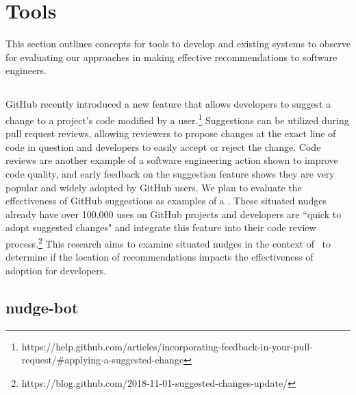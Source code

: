 \section{Tools}

This section outlines concepts for tools to develop and existing systems to observe for evaluating our approaches in making effective recommendations to software engineers.

\subsection{\TOOL}





\subsection{\SUGGS}

GitHub recently introduced a new feature that allows developers to suggest a change to a project's code modified by a user.\footnote{https://help.github.com/articles/incorporating-feedback-in-your-pull-request/\#applying-a-suggested-change} Suggestions can be utilized during pull request reviews, allowing reviewers to propose changes at the exact line of code in question and developers to easily accept or reject the change. Code reviews are another example of a software engineering action shown to improve code quality, and early feedback on the suggestion feature shows they are very popular and widely adopted by GitHub users. We plan to evaluate the effectiveness of GitHub suggestions as examples of a \location. These situated nudges already have over 100,000 uses on GitHub projects and developers are ``quick to adopt suggested changes" and integrate this feature into their code review process.\footnote{https://blog.github.com/2018-11-01-suggested-changes-update/} This research aims to examine situated nudges in the context of \SUGGS~to determine if the location of recommendations impacts the effectiveness of adoption for developers.

\subsection{nudge-bot}
